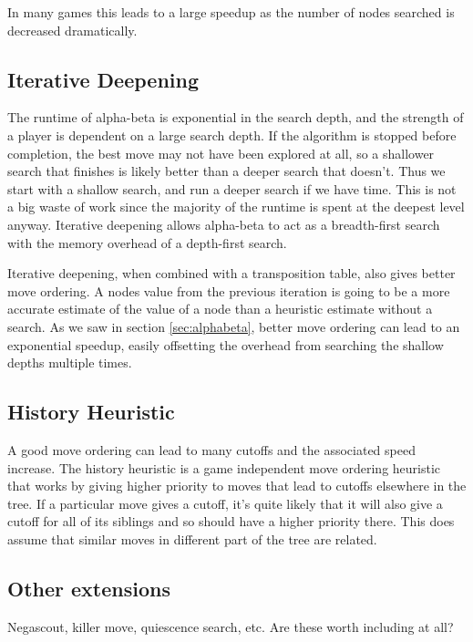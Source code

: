 In many games this leads to a large speedup as the number of nodes searched is decreased dramatically.


\subsection{Iterative Deepening}

The runtime of alpha-beta is exponential in the search depth, and the strength of a player is dependent on a large search depth. If the algorithm is stopped before completion, the best move may not have been explored at all, so a shallower search that finishes is likely better than a deeper search that doesn't. Thus we start with a shallow search, and run a deeper search if we have time. This is not a big waste of work since the majority of the runtime is spent at the deepest level anyway. Iterative deepening allows alpha-beta to act as a breadth-first search with the memory overhead of a depth-first search.

Iterative deepening, when combined with a transposition table, also gives better move ordering. A nodes value from the previous iteration is going to be a more accurate estimate of the value of a node than a heuristic estimate without a search. As we saw in section \ref{sec:alphabeta}, better move ordering can lead to an exponential speedup, easily offsetting the overhead from searching the shallow depths multiple times.

\subsection{History Heuristic}

A good move ordering can lead to many cutoffs and the associated speed increase. The history heuristic is a game independent move ordering heuristic that works by giving higher priority to moves that lead to cutoffs elsewhere in the tree. If a particular move gives a cutoff, it's quite likely that it will also give a cutoff for all of its siblings and so should have a higher priority there. This does assume that similar moves in different part of the tree are related.

\subsection{Other extensions}

Negascout, killer move, quiescence search, etc. Are these worth including at all?





